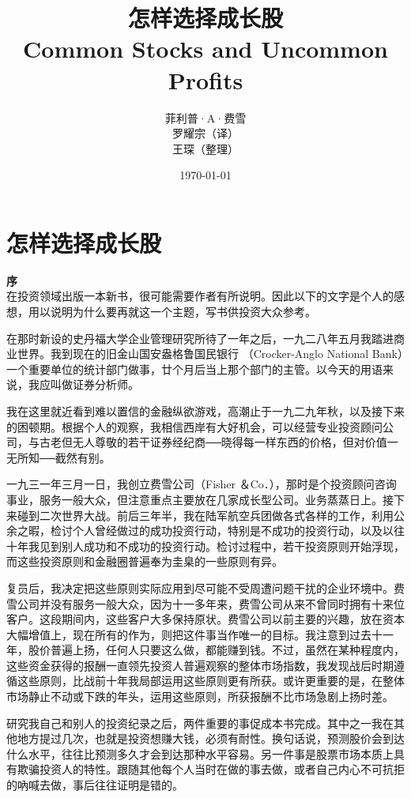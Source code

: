 \documentclass[UTF8,a4paper,zihao=-4,fontset = windows]{ctexart} %
\title{\textbf{怎样选择成长股 \\
                Common Stocks and Uncommon Profits}} %
\author{菲利普·A·费雪  \\   
        罗耀宗（译）    \\
        王琛（整理）}
\date{\today}
\begin{document}
\maketitle
\newpage
\tableofcontents
\newpage
\part{怎样选择成长股}

\textbf{序}
\\

在投资领域出版一本新书，很可能需要作者有所说明。因此以下的文字是个人的感想，用以说明为什么要再就这一个主题，写书供投资大众参考。

在那时新设的史丹福大学企业管理研究所待了一年之后，一九二八年五月我踏进商业世界。我到现在的旧金山国安盎格鲁国民银行
（Crocker-Anglo National Bank）一个重要单位的统计部门做事，廿个月后当上那个部门的主管。以今天的用语来说，我应叫做证券分析师。

我在这里就近看到难以置信的金融纵欲游戏，高潮止于一九二九年秋，以及接下来的困顿期。根据个人的观察，我相信西岸有大好机会，可以经营专业投资顾问公司，与古老但无人尊敬的若干证券经纪商──晓得每一样东西的价格，但对价值一无所知──截然有别。

一九三一年三月一日，我创立费雪公司（Fisher ＆Co．），那时是个投资顾问咨询事业，服务一般大众，但注意重点主要放在几家成长型公司。业务蒸蒸日上。接下来碰到二次世界大战。前后三年半，我在陆军航空兵团做各式各样的工作，利用公余之暇，检讨个人曾经做过的成功投资行动，特别是不成功的投资行动，以及以往十年我见到别人成功和不成功的投资行动。检讨过程中，若干投资原则开始浮现，而这些投资原则和金融圈普遍奉为圭臬的一些原则有异。

复员后，我决定把这些原则实际应用到尽可能不受周遭问题干扰的企业环境中。费雪公司并没有服务一般大众，因为十一多年来，费雪公司从来不曾同时拥有十来位客户。这段期间内，这些客户大多保持原状。费雪公司以前主要的兴趣，放在资本大幅增值上，现在所有的作为，则把这件事当作唯一的目标。我注意到过去十一年，股价普遍上扬，任何人只要这么做，都能赚到钱。不过，虽然在某种程度内，这些资金获得的报酬一直领先投资人普遍观察的整体市场指数，我发现战后时期遵循这些原则，比战前十年我局部运用这些原则更有所获。或许更重要的是，在整体市场静止不动或下跌的年头，运用这些原则，所获报酬不比市场急剧上扬时差。

研究我自己和别人的投资纪录之后，两件重要的事促成本书完成。其中之一我在其他地方提过几次，也就是投资想赚大钱，必须有耐性。换句话说，预测股价会到达什么水平，往往比预测多久才会到达那种水平容易。另一件事是股票市场本质上具有欺骗投资人的特性。跟随其他每个人当时在做的事去做，或者自己内心不可抗拒的吶喊去做，事后往往证明是错的。
\end{document}

